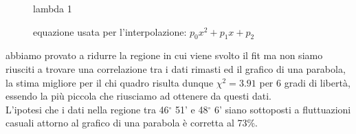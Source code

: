\documentclass[a4paper]{article}
\theoremstyle{definition}
\begin{document}
\begin{figure}[!htbp]
    	\captionsetup{labelformat=empty}
        \caption{lambda 1}
    \end{figure}



\begin{figure}[!ht]
    	\captionsetup{labelformat=empty}

		\caption{equazione usata per l'interpolazione: $p_{0}x^{2} + p_{1}x + p_{2}$}

\end{figure}
\pagebreak
\noindent abbiamo provato a ridurre la regione in cui viene svolto il fit ma non siamo riusciti a trovare una correlazione tra i dati rimasti ed il grafico di una parabola, la stima migliore per il chi quadro risulta dunque \(\chi ^{2} = 3.91\) per 6 gradi di libertà, essendo la più piccola che riusciamo ad ottenere da questi dati.\\
L'ipotesi che i dati nella regione tra 46$^{\circ}$ 51' e 48$^{\circ}$ 6' siano sottoposti a fluttuazioni casuali attorno al grafico di una parabola è corretta al 73\%. 
\end{document}
